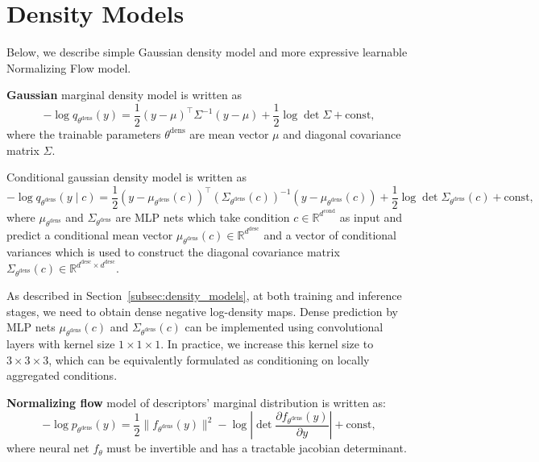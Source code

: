 
\section{Density Models}
\label{appendix:density_models}

Below, we describe simple Gaussian density model and more expressive learnable Normalizing Flow model.

\textbf{Gaussian} marginal density model is written as
\begin{equation}
    -\log q_{\theta^{\text{dens}}}(y) = \frac{1}{2}(y - \mu)^\top \Sigma^{-1} (y - \mu) + \frac{1}{2}\log \det \Sigma + \text{const},
\end{equation}
where the trainable parameters $\theta^{\text{dens}}$ are mean vector $\mu$ and diagonal covariance matrix $\Sigma$.

Conditional gaussian density model is written as
\begin{equation}
    -\log q_{\theta^{\text{dens}}}(y \mid c) = \frac{1}{2}(y - \mu_{\theta^{\text{dens}}}(c))^\top \left(\Sigma_{\theta^{\text{dens}}}(c)\right)^{-1}(y - \mu_{\theta^{\text{dens}}}(c)) + \frac{1}{2}\log \det \Sigma_{\theta^{\text{dens}}}(c) + \text{const},
\end{equation}
where $\mu_{\theta^{\text{dens}}}$ and $\Sigma_{\theta^{\text{dens}}}$ are MLP nets which take condition $c \in \mathbb{R}^{d^{\text{cond}}}$ as input and predict a conditional mean vector $\mu_{\theta^{\text{dens}}}(c) \in \mathbb{R}^{d^{\text{desc}}}$ and a vector of conditional variances which is used to construct the diagonal covariance matrix $\Sigma_{\theta^{\text{dens}}}(c) \in \mathbb{R}^{d^{\text{desc}} \times d^{\text{desc}}}$. 

As described in Section~\ref{subsec:density_models}, at both training and inference stages, we need to obtain dense negative log-density maps. Dense prediction by MLP nets $\mu_{\theta^{\text{dens}}}(c)$ and $\Sigma_{\theta^{\text{dens}}}(c)$ can be implemented using convolutional layers with kernel size $1 \times 1 \times 1$. In practice, we increase this kernel size to $3 \times 3 \times 3$, which can be equivalently formulated as conditioning on locally aggregated conditions.

\textbf{Normalizing flow} model of descriptors' marginal distribution is written as:
\begin{equation}
    -\log p_{\theta^{\text{dens}}}(y) = \frac{1}{2}\|f_{\theta^{\text{dens}}}(y)\|^2 - \log \left| \det \dfrac{\partial f_{\theta^{\text{dens}}}(y)}{\partial y} \right| + \text{const},
\end{equation}
where neural net $f_\theta$ must be invertible and has a tractable jacobian determinant.

